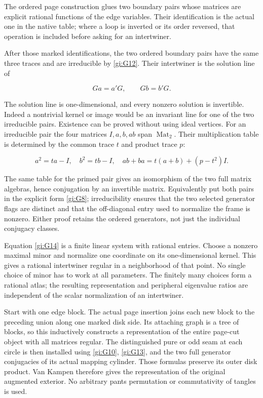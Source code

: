 The ordered page construction glues two boundary pairs whose
matrices are explicit rational functions of the edge variables.
Their identification is the actual one in the native table;
where a loop is inverted or its order reversed, that operation
is included before asking for an intertwiner.

After those marked identifications, the two ordered boundary
pairs have the same three traces and are irreducible by \eqref{gi:G12}.
Their intertwiner is the solution line of

\begin{equation}\label{gi:G14}
G a=a'G,\qquad G b=b'G.
\end{equation}

The solution line is one-dimensional, and every nonzero solution
is invertible. Indeed a nontrivial kernel or image would be an
invariant line for one of the two irreducible pairs. Existence
can be proved without using ideal vertices. For an irreducible
pair the four matrices \(I,a,b,ab\) span
\(\operatorname{Mat}_2\). Their multiplication table is
determined by the common trace \(t\) and product trace \(p\):

\begin{equation}\label{gi:G14a}
a^2=ta-I,\quad b^2=tb-I,\quad
 ab+ba=t(a+b)+(p-t^2)I.
\end{equation}

The same table for the primed pair gives an isomorphism of
the two full matrix algebras, hence conjugation by an
invertible matrix. Equivalently put both pairs in the
explicit form \eqref{gi:G8}; irreducibility ensures that the two
selected generator flags are distinct and that the
off-diagonal entry used to normalize the frame is nonzero.
Either proof retains the ordered generators, not just the
individual conjugacy classes.

Equation \eqref{gi:G14} is a finite linear system with rational entries.
Choose a nonzero maximal minor and normalize one coordinate
on its one-dimensional kernel. This gives a rational
intertwiner regular in a neighborhood of that point.
No single choice of minor has to work at all parameters.
The finitely many choices form a rational atlas; the resulting
representation and peripheral eigenvalue ratios are independent
of the scalar normalization of an intertwiner.

Start with one edge block. The actual page insertion joins each
new block to the preceding union along one marked disk side.
Its attaching graph is a tree of blocks, so this inductively
constructs a representation of the entire page-cut object with
all matrices regular. The distinguished pure or odd seam at
each circle is then installed using \eqref{gi:G10}, \eqref{gi:G13}, and the two
full generator conjugacies of its actual mapping cylinder.
Those formulas preserve its outer disk product. Van Kampen
therefore gives the representation of the original augmented
exterior. No arbitrary pants permutation or commutativity of
tangles is used.

